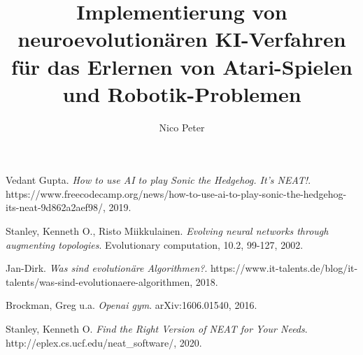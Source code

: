 \documentclass[oneside, ngerman, draft]{sdqthesis}
\author{Nico Peter}
\title{Implementierung von neuroevolutionären KI-Verfahren für das Erlernen von Atari-Spielen und Robotik-Problemen}
\begin{document}
\setpdf

\maketitle

\frontmatter



\setcounter{page}{1}

 


\tableofcontents

\listoftables


\mainmatter







\printbibliography[
heading=bibintoc,
title={Literatur}
]

\begin{thebibliography}{9}
	Vedant Gupta. 
	\textit{How to use AI to play Sonic the Hedgehog. It’s NEAT!}. 
	https://www.freecodecamp.org/news/how-to-use-ai-to-play-sonic-the-hedgehog-its-neat-9d862a2aef98/, 2019.
	
	Stanley, Kenneth O., Risto Miikkulainen. 
	\textit{Evolving neural networks through augmenting topologies}.
	Evolutionary computation, 10.2, 99-127, 2002.
	
	Jan-Dirk. 
	\textit{Was sind evolutionäre Algorithmen?}.
	https://www.it-talents.de/blog/it-talents/was-sind-evolutionaere-algorithmen, 2018.
	
	Brockman, Greg u.a.
	\textit{Openai gym}.
	arXiv:1606.01540, 2016.
	
	Stanley, Kenneth O. 
	\textit{Find the Right Version of NEAT for Your Needs}.
	http://eplex.cs.ucf.edu/neat\_software/, 2020.
	
	
\end{thebibliography}
\end{document}
